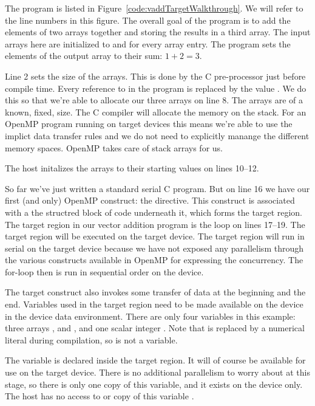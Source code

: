 The program is listed in Figure~\ref{code:vaddTargetWalkthrough}.
We will refer to the line numbers in this figure.
The overall goal of the program is to add the elements of two arrays together and storing the results in a third array.
The input arrays here are initialized to  and  for every array entry.
The program sets the elements of the output array to their sum: $1+2=3$.

Line 2 sets the size of the arrays.
This is done by the C pre-processor just before compile time.
Every reference to  in the program is replaced by the value .
We do this so that we're able to allocate our three arrays on line 8.
The arrays are of a known, fixed, size.
The C compiler will allocate the memory on the stack.
For an OpenMP program running on target devices this means we're able to use the implict data transfer rules and we do not need to explicitly manange the different memory spaces.
OpenMP takes care of stack arrays for us.

The host initalizes the arrays to their starting values on lines 10--12.

So far we've just written a standard serial C program.
But on line 16 we have our first (and only) OpenMP construct: the  directive.
This construct is associated with a the structred block of code underneath it, which forms the target region.
The target region in our vector addition program is the  loop on lines 17--19.
The target region will be executed on the target device.
The target region will run in serial on the target device because we have not exposed any parallelism through the various constructs available in OpenMP for expressing the concurrency.
The for-loop then is run in sequential order on the device.

The target construct also invokes some transfer of data at the beginning and the end.
Variables used in the target region need to be made available on the device in the device data environment.
There are only four variables in this example: three arrays ,  and , and one scalar integer .
Note that  is replaced by a numerical literal during compilation, so is not a variable.

The variable  is declared inside the target region.
It will of course be available for use on the target device.
There is no additional parallelism to worry about at this stage, so there is only one copy of this variable, and it exists on the device only.
The host has no access to or copy of this variable .

